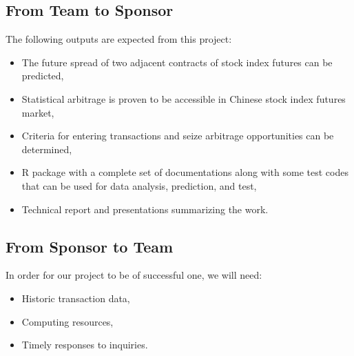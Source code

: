 \documentclass[12pt,letterpaper]{article}
\theoremstyle{definition}
\begin{document}
\subsection{From Team to Sponsor} %
The following outputs are expected from this project:
\begin{itemize}
    \item The future spread of two adjacent contracts of stock index futures can be predicted, 
    \item Statistical arbitrage is proven to be accessible in Chinese stock index futures market,
    \item Criteria for entering transactions and seize arbitrage opportunities can be determined,
    \item	R package with a complete set of documentations along with some test codes that can be used for data analysis, prediction, and test,
    \item Technical report and presentations summarizing the work.
\end{itemize}

\subsection{From Sponsor to Team} %

In order for our project to be of successful one, we will need:
\begin{itemize}
    \item Historic transaction data,
    \item Computing resources,
    \item Timely responses to inquiries.
\end{itemize}


%
%
\end{document}
